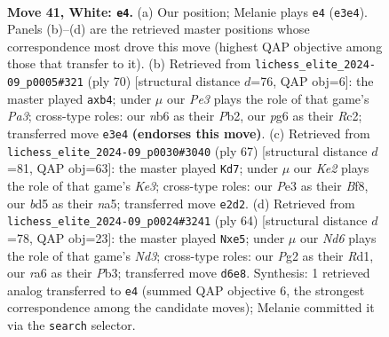 \documentclass[11pt]{article}
\begin{document}
\clearpage

\begin{figure}[p]\centering
\begin{subfigure}{0.46\textwidth}\centering
\resizebox{\linewidth}{!}{%
\newchessgame
\chessboard[
  setfen={5k2/r4p1p/rn1N2p1/p2bp1P1/P7/1P2P1RP/4K1P1/RN6 w - - 1 41},
  showmover=false,
  pgfstyle=straightmove, color=movearrow, markmove={e3-e4}
]}
\caption{}
\end{subfigure}\hfill
\begin{subfigure}{0.46\textwidth}\centering
\resizebox{\linewidth}{!}{%
\newchessgame
\chessboard[
  setfen={rr6/5pk1/2pb4/3p3B/pp1P1P2/PnN3P1/1PR2P2/3R2K1 w - - 0 36},
  showmover=false,
  pgfstyle=straightmove, color=movearrow, markmove={a3-b4}
]}
\caption{}
\end{subfigure}
\\[4pt]
\begin{subfigure}{0.46\textwidth}\centering
\resizebox{\linewidth}{!}{%
\newchessgame
\chessboard[
  setfen={5b2/p1r4p/4kpp1/NR2p3/P1p1n3/4B2P/1PP2PP1/4K3 b - - 5 34},
  showmover=false,
  pgfstyle=straightmove, color=movearrow, markmove={e6-d7}
]}
\caption{}
\end{subfigure}\hfill
\begin{subfigure}{0.46\textwidth}\centering
\resizebox{\linewidth}{!}{%
\newchessgame
\chessboard[
  setfen={3r4/8/1p1rk2p/p1p1n1p1/3pP1PP/1P1N2K1/P2R1P2/3R4 w - - 1 33},
  showmover=false,
  pgfstyle=straightmove, color=movearrow, markmove={d3-e5}
]}
\caption{}
\end{subfigure}
\caption{\textbf{Move 41, White: \texttt{e4}.} (a) Our position; Melanie plays \texttt{e4} (\texttt{e3e4}). Panels (b)--(d) are the retrieved master positions whose correspondence most drove this move (highest QAP objective among those that transfer to it). (b) Retrieved from \texttt{lichess\_elite\_2024-09\_p0005\#321} (ply 70) [structural distance $d$=76, QAP obj=6]: the master played \texttt{axb4}; under $\mu$ our \emph{Pe3} plays the role of that game's \emph{Pa3}; cross-type roles: our \emph{n}b6 as their \emph{P}b2, our \emph{p}g6 as their \emph{R}c2; transferred move \texttt{e3e4} \textbf{(endorses this move)}. (c) Retrieved from \texttt{lichess\_elite\_2024-09\_p0030\#3040} (ply 67) [structural distance $d$=81, QAP obj=63]: the master played \texttt{Kd7}; under $\mu$ our \emph{Ke2} plays the role of that game's \emph{Ke3}; cross-type roles: our \emph{P}e3 as their \emph{B}f8, our \emph{b}d5 as their \emph{n}a5; transferred move \texttt{e2d2}. (d) Retrieved from \texttt{lichess\_elite\_2024-09\_p0024\#3241} (ply 64) [structural distance $d$=78, QAP obj=23]: the master played \texttt{Nxe5}; under $\mu$ our \emph{Nd6} plays the role of that game's \emph{Nd3}; cross-type roles: our \emph{P}g2 as their \emph{R}d1, our \emph{r}a6 as their \emph{P}b3; transferred move \texttt{d6e8}. Synthesis: 1 retrieved analog transferred to \texttt{e4} (summed QAP objective 6, the strongest correspondence among the candidate moves); Melanie committed it via the \texttt{search} selector.}
\label{fig:thought-m80}
\end{figure}
\end{document}
